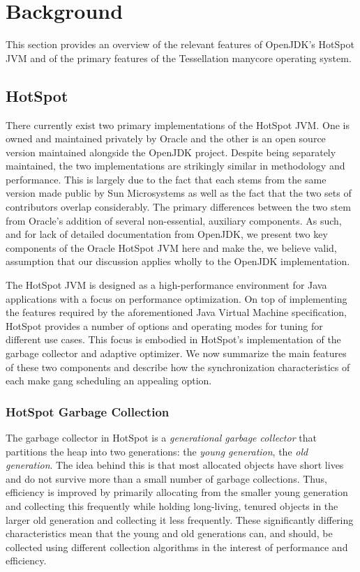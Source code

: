 \documentclass{sig-alternate}
\begin{document}
\section{Background} \label{sec:background}
This section provides an overview of the relevant features of OpenJDK's HotSpot JVM and of the primary features of the Tessellation manycore operating system.

\subsection{HotSpot}
There currently exist two primary implementations of the HotSpot JVM. One is owned and maintained privately by Oracle and the other is an open source version maintained alongside the OpenJDK project. Despite being separately maintained, the two implementations are strikingly similar in methodology and performance. This is largely due to the fact that each stems from the same version made public by Sun Microsystems as well as the fact that the two sets of contributors overlap considerably. The primary differences between the two stem from Oracle's addition of several non-essential, auxiliary components. As such, and for lack of detailed documentation from OpenJDK, we present two key components of the Oracle HotSpot JVM here and make the, we believe valid, assumption that our discussion applies wholly to the OpenJDK implementation.

The HotSpot JVM is designed as a high-performance environment for Java applications with a focus on performance optimization. On top of implementing the features required by the aforementioned Java Virtual Machine specification, HotSpot provides a number of options and operating modes for tuning for different use cases. This focus is embodied in HotSpot's implementation of the garbage collector and adaptive optimizer. We now summarize the main features of these two components and describe how the synchronization characteristics of each make gang scheduling an appealing option.

\subsubsection{HotSpot Garbage Collection}
The garbage collector in HotSpot is a \textit{generational garbage collector} \cite{hotspot:memory} that partitions the heap into two generations: the \textit{young generation}, the \textit{old generation}. The idea behind this is that most allocated objects have short lives and do not survive more than a small number of garbage collections. Thus, efficiency is improved by primarily allocating from the smaller young generation and collecting this frequently while holding long-living, tenured objects in the larger old generation and collecting it less frequently. These significantly differing characteristics mean that the young and old generations can, and should, be collected using different collection algorithms in the interest of performance and efficiency.
\end{document}
